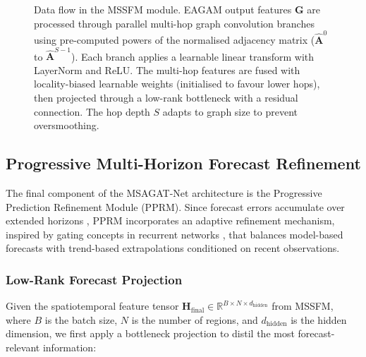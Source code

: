 \documentclass[a4paper,fleqn]{cas-dc}
\begin{document}
\begin{figure}[!ht]
{}%
\caption{Data flow in the MSSFM module. EAGAM output features $\mathbf{G}$ are processed through parallel multi-hop graph convolution branches using pre-computed powers of the normalised adjacency matrix ($\hat{\mathbf{A}}^0$ to $\hat{\mathbf{A}}^{S-1}$). Each branch applies a learnable linear transform with LayerNorm and ReLU. The multi-hop features are fused with locality-biased learnable weights (initialised to favour lower hops), then projected through a low-rank bottleneck with a residual connection. The hop depth $S$ adapts to graph size to prevent oversmoothing.}
\label{fig:mssfm_module}
\end{figure}


\subsection{Progressive Multi-Horizon Forecast Refinement}

The final component of the MSAGAT-Net architecture is the Progressive Prediction Refinement Module (PPRM). Since forecast errors accumulate over extended horizons \cite{BENTAIEB20127067, chandra2021evaluation}, PPRM incorporates an adaptive refinement mechanism, inspired by gating concepts in recurrent networks \cite{hochreiter1997long}, that balances model-based forecasts with trend-based extrapolations conditioned on recent observations.


\subsubsection{Low-Rank Forecast Projection}

Given the spatiotemporal feature tensor $\mathbf{H}_{\text{final}} \in \mathbb{R}^{B \times N \times d_{\text{hidden}}}$ from MSSFM, where $B$ is the batch size, $N$ is the number of regions, and $d_{\text{hidden}}$ is the hidden dimension, we first apply a bottleneck projection to distil the most forecast-relevant information:
\end{document}
